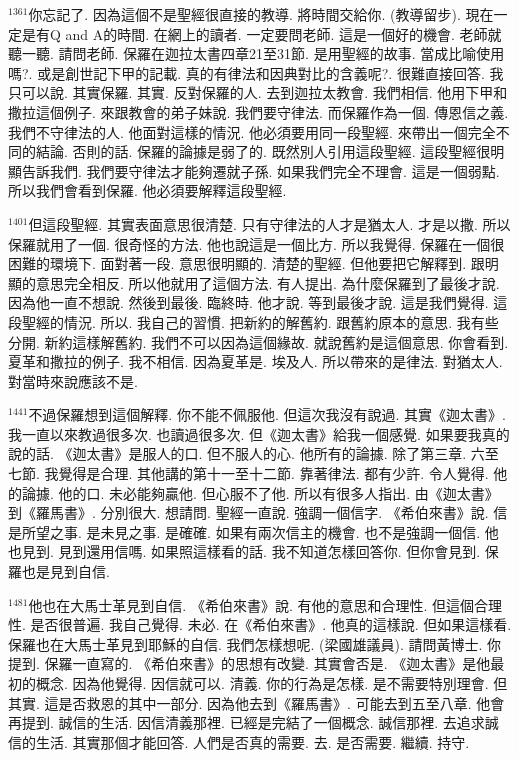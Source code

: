 \documentclass{book}
\begin{document}
$^{1361}$你忘記了.
因為這個不是聖經很直接的教導.
將時間交給你.
(教導留步).
現在一定是有Q and A的時間.
在網上的讀者.
一定要問老師.
這是一個好的機會.
老師就聽一聽.
請問老師.
保羅在迦拉太書四章21至31節.
是用聖經的故事.
當成比喻使用嗎?.
或是創世記下甲的記載.
真的有律法和因典對比的含義呢?.
很難直接回答.
我只可以說.
其實保羅.
其實.
反對保羅的人.
去到迦拉太教會.
我們相信.
他用下甲和撒拉這個例子.
來跟教會的弟子妹說.
我們要守律法.
而保羅作為一個.
傳恩信之義.
我們不守律法的人.
他面對這樣的情況.
他必須要用同一段聖經.
來帶出一個完全不同的結論.
否則的話.
保羅的論據是弱了的.
既然別人引用這段聖經.
這段聖經很明顯告訴我們.
我們要守律法才能夠遷就子孫.
如果我們完全不理會.
這是一個弱點.
所以我們會看到保羅.
他必須要解釋這段聖經.

$^{1401}$但這段聖經.
其實表面意思很清楚.
只有守律法的人才是猶太人.
才是以撒.
所以保羅就用了一個.
很奇怪的方法.
他也說這是一個比方.
所以我覺得.
保羅在一個很困難的環境下.
面對著一段.
意思很明顯的.
清楚的聖經.
但他要把它解釋到.
跟明顯的意思完全相反.
所以他就用了這個方法.
有人提出.
為什麼保羅到了最後才說.
因為他一直不想說.
然後到最後.
臨終時.
他才說.
等到最後才說.
這是我們覺得.
這段聖經的情況.
所以.
我自己的習慣.
把新約的解舊約.
跟舊約原本的意思.
我有些分開.
新約這樣解舊約.
我們不可以因為這個緣故.
就說舊約是這個意思.
你會看到.
夏革和撒拉的例子.
我不相信.
因為夏革是.
埃及人.
所以帶來的是律法.
對猶太人.
對當時來說應該不是.

$^{1441}$不過保羅想到這個解釋.
你不能不佩服他.
但這次我沒有說過.
其實《迦太書》.
我一直以來教過很多次.
也讀過很多次.
但《迦太書》給我一個感覺.
如果要我真的說的話.
《迦太書》是服人的口.
但不服人的心.
他所有的論據.
除了第三章.
六至七節.
我覺得是合理.
其他講的第十一至十二節.
靠著律法.
都有少許.
令人覺得.
他的論據.
他的口.
未必能夠贏他.
但心服不了他.
所以有很多人指出.
由《迦太書》到《羅馬書》.
分別很大.
想請問.
聖經一直說.
強調一個信字.
《希伯來書》說.
信是所望之事.
是未見之事.
是確確.
如果有兩次信主的機會.
也不是強調一個信.
他也見到.
見到還用信嗎.
如果照這樣看的話.
我不知道怎樣回答你.
但你會見到.
保羅也是見到自信.

$^{1481}$他也在大馬士革見到自信.
《希伯來書》說.
有他的意思和合理性.
但這個合理性.
是否很普遍.
我自己覺得.
未必.
在《希伯來書》.
他真的這樣說.
但如果這樣看.
保羅也在大馬士革見到耶穌的自信.
我們怎樣想呢.
(梁國雄議員).
請問黃博士.
你提到.
保羅一直寫的.
《希伯來書》的思想有改變.
其實會否是.
《迦太書》是他最初的概念.
因為他覺得.
因信就可以.
清義.
你的行為是怎樣.
是不需要特別理會.
但其實.
這是否救恩的其中一部分.
因為他去到《羅馬書》.
可能去到五至八章.
他會再提到.
誠信的生活.
因信清義那裡.
已經是完結了一個概念.
誠信那裡.
去追求誠信的生活.
其實那個才能回答.
人們是否真的需要.
去.
是否需要.
繼續.
持守.
\end{document}

